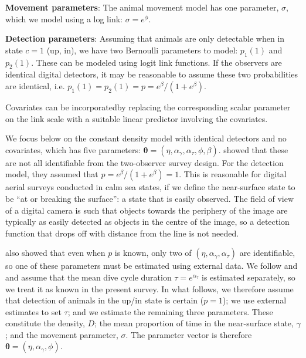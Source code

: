 \documentclass[useAMS, usenatbib, referee]{biom}\usepackage[]{graphicx}\usepackage[]{color}
\begin{document}
\textbf{Movement parameters}: The animal movement model has one parameter, $\sigma$, which we model using a log link: $\sigma=e^\phi$.

\textbf{Detection parameters}: Assuming that animals are only detectable when in state $c=1$ (up, in), we have two Bernoulli parameters to model: $p_1(1)$ and  $p_2(1)$. These can be modeled using logit link functions. If the observers are identical digital detectors, it may be reasonable to assume these two probabilities are identical, i.e. $p_1(1)=p_2(1)=p=e^\beta/(1+e^\beta)$.

Covariates can be incorporatedby replacing the corresponding scalar parameter on the link scale with a suitable linear predictor involving the covariates.


We focus below on the constant density model with identical detectors and no covariates, which has five parameters: $\bm{\theta}=(\eta,\alpha_\gamma,\alpha_\tau, \phi, \beta)$. \cite{Stevenson+al:19} showed that these are not all identifiable from the two-observer survey design. For the detection model, they assumed that $p=e^\beta/(1+e^\beta)=1$. This is reasonable for digital aerial surveys conducted in calm sea states, if we define the near-surface state to be ``at or breaking the surface'': a state that is easily observed. The field of view of a digital camera is such that objects towards the periphery of the image are typically as easily detected as objects in the centre of the image, so a detection function that drops off with distance from the line is not needed.

\cite{Stevenson+al:19} also showed that even when $p$ is known, only two of $(\eta,\alpha_\gamma,\alpha_\tau)$ are identifiable, so one of these parameters must be estimated using external data. We follow \cite{Stevenson+al:19} and \cite{Hiby+Lovell:98} and assume that the mean dive cycle duration $\tau=e^{\alpha_\tau}$ is estimated separately, so we treat it as known in the present survey. In what follows, we therefore assume that detection of animals in the up/in state is certain ($p=1$); we use external estimates to set $\tau$; and we estimate the remaining three parameters. These constitute the density, $D$; the mean proportion of time in the near-surface state, $\gamma$; and the movement parameter, $\sigma$. The parameter vector is therefore $\bm{\theta}=(\eta,\alpha_\gamma, \phi)$.

\end{document}

